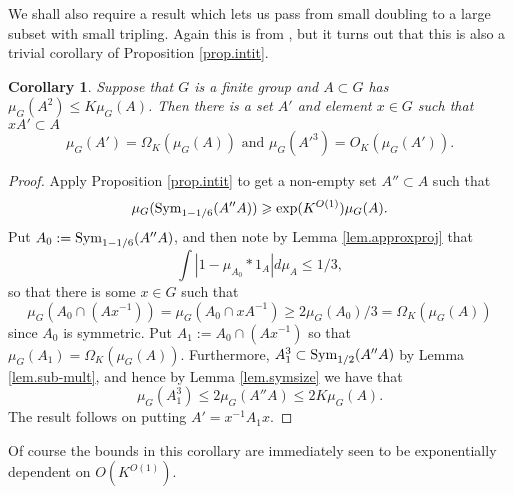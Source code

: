 \documentclass[12pt]{amsart}
\numberwithin{equation}{section}
\theoremstyle{plain}
\newtheorem{corollary}[subsection]{Corollary}
\theoremstyle{definition}
\renewcommand{\leq}{\leqslant}
\renewcommand{\geq}{\geqslant}
\providecommand{\Sym}{\mathop{\rm Sym}\nolimits}
\begin{document}
We shall also require a result which lets us pass from small doubling to a large subset with small tripling.  Again this is from \cite{TCTNC}, but it turns out that this is also a trivial corollary of Proposition \ref{prop.intit}.
\begin{corollary}\label{cor.doub2trip}
Suppose that $G$ is a finite group and $A \subset G$ has $\mu_G(A^2) \leq K\mu_G(A)$. Then there is a set $A'$ and element $x \in G$ such that $xA' \subset A$
\begin{equation*}
\mu_G(A') = \Omega_K(\mu_G(A)) \textrm{ and } \mu_G(A'^3) =O_K(\mu_G(A')).
\end{equation*}
\end{corollary}
\begin{proof}
Apply Proposition \ref{prop.intit} to get a non-empty set $A'' \subset A$ such that
\begin{equation*}
\mu_G(\Sym_{1-1/6}(A''A)) \geq \exp(K^{O(1)})\mu_G(A).
\end{equation*}
Put $A_0 :=\Sym_{1-1/6}(A''A)$, and then note by Lemma \ref{lem.approxproj} that
\begin{equation*}
\int{|1-\mu_{A_0} \ast 1_A|d\mu_A} \leq 1/3,
\end{equation*}
so that there is some $x \in G$ such that
\begin{equation*}
\mu_G( A_0 \cap (Ax^{-1}))=\mu_G(A_0 \cap xA^{-1})\geq 2\mu_G(A_0)/3=\Omega_K(\mu_G(A)) 
\end{equation*}
since $A_0$ is symmetric.  Put $A_1:=A_0 \cap (Ax^{-1})$ so that $\mu_G(A_1) = \Omega_K(\mu_G(A))$.  Furthermore, $A_1^3 \subset \Sym_{1/2}(A''A)$ by Lemma \ref{lem.sub-mult}, and hence by Lemma \ref{lem.symsize} we have that
\begin{equation*}
\mu_G(A_1^3) \leq 2\mu_G(A''A) \leq 2K\mu_G(A).
\end{equation*}
The result follows on putting $A'=x^{-1}A_1x$.
\end{proof}
Of course the bounds in this corollary are immediately seen to be exponentially dependent on $O(K^{O(1)})$. 
\end{document}
